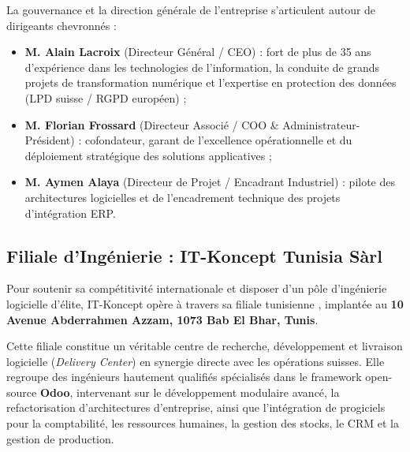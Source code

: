 La gouvernance et la direction générale de l'entreprise s'articulent autour de dirigeants chevronnés :
\begin{itemize}[leftmargin=1.5cm, label=\textcolor{odooPurple}{\small\textbullet}]
    \item \textbf{M. Alain Lacroix} (Directeur Général / CEO) : fort de plus de 35 ans d'expérience dans les technologies de l'information, la conduite de grands projets de transformation numérique et l'expertise en protection des données (LPD suisse / RGPD européen) ;
    \item \textbf{M. Florian Frossard} (Directeur Associé / COO \& Administrateur-Président) : cofondateur, garant de l'excellence opérationnelle et du déploiement stratégique des solutions applicatives ;
    \item \textbf{M. Aymen Alaya} (Directeur de Projet / Encadrant Industriel) : pilote des architectures logicielles et de l'encadrement technique des projets d'intégration ERP.
\end{itemize}

\subsection{Filiale d'Ingénierie : IT-Koncept Tunisia Sàrl}
Pour soutenir sa compétitivité internationale et disposer d'un pôle d'ingénierie logicielle d'élite, IT-Koncept opère à travers sa filiale tunisienne \textbf{\companySubsidiary}, implantée au \textbf{10 Avenue Abderrahmen Azzam, 1073 Bab El Bhar, Tunis}.

Cette filiale constitue un véritable centre de recherche, développement et livraison logicielle (\textit{Delivery Center}) en synergie directe avec les opérations suisses. Elle regroupe des ingénieurs hautement qualifiés spécialisés dans le framework open-source \textbf{Odoo}, intervenant sur le développement modulaire avancé, la refactorisation d'architectures d'entreprise, ainsi que l'intégration de progiciels pour la comptabilité, les ressources humaines, la gestion des stocks, le CRM et la gestion de production.

